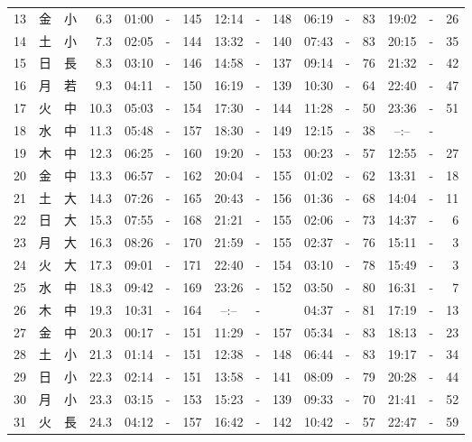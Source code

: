 \documentclass[12pt.a4j]{jsarticle}
\begin{document}
\begin{center}
\begin{table}[ht]
\begin{tabular}{|rc|cr|ccrccr|ccrccr|}
13 & 金 & 小 &  6.3 &  01:00 &-& 145  &  12:14 &-& 148  &   06:19 &-&  83  &   19:02 &-&  26  \\
14 & 土 & 小 &  7.3 &  02:05 &-& 144  &  13:32 &-& 140  &   07:43 &-&  83  &   20:15 &-&  35  \\
15 & 日 & 長 &  8.3 &  03:10 &-& 146  &  14:58 &-& 137  &   09:14 &-&  76  &   21:32 &-&  42  \\
16 & 月 & 若 &  9.3 &  04:11 &-& 150  &  16:19 &-& 139  &   10:30 &-&  64  &   22:40 &-&  47  \\
17 & 火 & 中 & 10.3 &  05:03 &-& 154  &  17:30 &-& 144  &   11:28 &-&  50  &   23:36 &-&  51  \\
18 & 水 & 中 & 11.3 &  05:48 &-& 157  &  18:30 &-& 149  &   12:15 &-&  38  &   --:-- &-&     \\
19 & 木 & 中 & 12.3 &  06:25 &-& 160  &  19:20 &-& 153  &   00:23 &-&  57  &   12:55 &-&  27  \\
20 & 金 & 中 & 13.3 &  06:57 &-& 162  &  20:04 &-& 155  &   01:02 &-&  62  &   13:31 &-&  18  \\
21 & 土 & 大 & 14.3 &  07:26 &-& 165  &  20:43 &-& 156  &   01:36 &-&  68  &   14:04 &-&  11  \\
22 & 日 & 大 & 15.3 &  07:55 &-& 168  &  21:21 &-& 155  &   02:06 &-&  73  &   14:37 &-&   6  \\
23 & 月 & 大 & 16.3 &  08:26 &-& 170  &  21:59 &-& 155  &   02:37 &-&  76  &   15:11 &-&   3  \\
24 & 火 & 大 & 17.3 &  09:01 &-& 171  &  22:40 &-& 154  &   03:10 &-&  78  &   15:49 &-&   3  \\
25 & 水 & 中 & 18.3 &  09:42 &-& 169  &  23:26 &-& 152  &   03:50 &-&  80  &   16:31 &-&   7  \\
26 & 木 & 中 & 19.3 &  10:31 &-& 164  &  --:-- &-&     &   04:37 &-&  81  &   17:19 &-&  13  \\
27 & 金 & 中 & 20.3 &  00:17 &-& 151  &  11:29 &-& 157  &   05:34 &-&  83  &   18:13 &-&  23  \\
28 & 土 & 小 & 21.3 &  01:14 &-& 151  &  12:38 &-& 148  &   06:44 &-&  83  &   19:17 &-&  34  \\
29 & 日 & 小 & 22.3 &  02:14 &-& 151  &  13:58 &-& 141  &   08:09 &-&  79  &   20:28 &-&  44  \\
30 & 月 & 小 & 23.3 &  03:15 &-& 153  &  15:23 &-& 139  &   09:33 &-&  70  &   21:41 &-&  52  \\
31 & 火 & 長 & 24.3 &  04:12 &-& 157  &  16:42 &-& 142  &   10:42 &-&  57  &   22:47 &-&  59  \\

\end{tabular}
\end{table}
\end{center}
\end{document}
